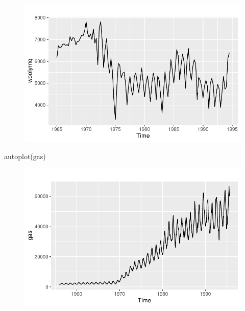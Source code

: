 \documentclass[
  letterpaper,
  DIV=11,
  numbers=noendperiod]{scrartcl}
\newenvironment{Shaded}{\begin{snugshade}}{\end{snugshade}}
\newcommand{\FunctionTok}[1]{\textcolor[rgb]{0.28,0.35,0.67}{#1}}
\newcommand{\NormalTok}[1]{\textcolor[rgb]{0.00,0.23,0.31}{#1}}
\begin{document}
\begin{figure}[H]

{\centering \includegraphics{forecasting_datacamp_ex_files/figure-pdf/unnamed-chunk-2-2.pdf}

}

\end{figure}

\begin{Shaded}
\begin{Highlighting}[]
\FunctionTok{autoplot}\NormalTok{(gas)}
\end{Highlighting}
\end{Shaded}

\begin{figure}[H]

{\centering \includegraphics{forecasting_datacamp_ex_files/figure-pdf/unnamed-chunk-2-3.pdf}

}

\end{figure}
\end{document}

